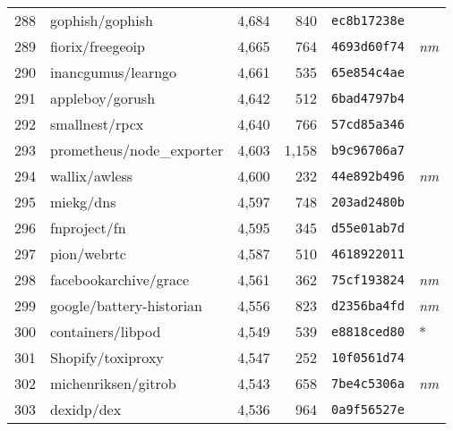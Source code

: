 {\begin{supertabular}{llrrll}
        288 &                    gophish/gophish &  4,684 &    840 &  \texttt{ec8b17238e} &              \\
        289 &                   fiorix/freegeoip &  4,665 &    764 &  \texttt{4693d60f74} &  \textit{nm} \\
        290 &                 inancgumus/learngo &  4,661 &    535 &  \texttt{65e854c4ae} &              \\
        291 &                    appleboy/gorush &  4,642 &    512 &  \texttt{6bad4797b4} &              \\
        292 &                     smallnest/rpcx &  4,640 &    766 &  \texttt{57cd85a346} &              \\
        293 &          prometheus/node\_exporter &  4,603 &  1,158 &  \texttt{b9c96706a7} &              \\
        294 &                      wallix/awless &  4,600 &    232 &  \texttt{44e892b496} &  \textit{nm} \\
        295 &                          miekg/dns &  4,597 &    748 &  \texttt{203ad2480b} &              \\
        296 &                       fnproject/fn &  4,595 &    345 &  \texttt{d55e01ab7d} &              \\
        297 &                        pion/webrtc &  4,587 &    510 &  \texttt{4618922011} &              \\
        298 &              facebookarchive/grace &  4,561 &    362 &  \texttt{75cf193824} &  \textit{nm} \\
        299 &           google/battery-historian &  4,556 &    823 &  \texttt{d2356ba4fd} &  \textit{nm} \\
        300 &                  containers/libpod &  4,549 &    539 &  \texttt{e8818ced80} &            * \\
        301 &                  Shopify/toxiproxy &  4,547 &    252 &  \texttt{10f0561d74} &              \\
        302 &                michenriksen/gitrob &  4,543 &    658 &  \texttt{7be4c5306a} &  \textit{nm} \\
        303 &                         dexidp/dex &  4,536 &    964 &  \texttt{0a9f56527e} &              \\

\end{supertabular}}
